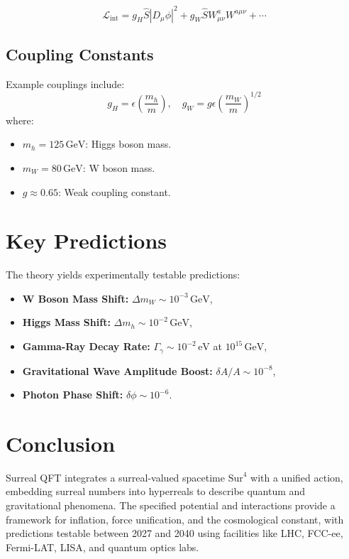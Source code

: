 \documentclass[a4paper,12pt]{article}
\begin{document}
\[
\mathcal{L}_{\text{int}} = g_H \hat{S} |D_\mu \phi|^2 + g_W \hat{S} W^a_{\mu\nu} W^{a\mu\nu} + \cdots
\]

\subsection{Coupling Constants}
Example couplings include:
\[
g_H = \epsilon \left( \frac{m_h}{m} \right), \quad g_W = g \epsilon \left( \frac{m_W}{m} \right)^{1/2}
\]
where:
\begin{itemize}
    \item \(m_h = 125 \, \text{GeV}\): Higgs boson mass.
    \item \(m_W = 80 \, \text{GeV}\): W boson mass.
    \item \(g \approx 0.65\): Weak coupling constant.
\end{itemize}

\section{Key Predictions}
The theory yields experimentally testable predictions:
\begin{itemize}
    \item \textbf{W Boson Mass Shift:} \(\Delta m_W \sim 10^{-3} \, \text{GeV}\),
    \item \textbf{Higgs Mass Shift:} \(\Delta m_h \sim 10^{-2} \, \text{GeV}\),
    \item \textbf{Gamma-Ray Decay Rate:} \(\Gamma_{\gamma} \sim 10^{-2} \, \text{eV}\) at \(10^{15} \, \text{GeV}\),
    \item \textbf{Gravitational Wave Amplitude Boost:} \(\delta A / A \sim 10^{-8}\),
    \item \textbf{Photon Phase Shift:} \(\delta \phi \sim 10^{-6}\).
\end{itemize}

\section{Conclusion}
Surreal QFT integrates a surreal-valued spacetime \(\text{Sur}^4\) with a unified action, embedding surreal numbers into hyperreals to describe quantum and gravitational phenomena. The specified potential and interactions provide a framework for inflation, force unification, and the cosmological constant, with predictions testable between 2027 and 2040 using facilities like LHC, FCC-ee, Fermi-LAT, LISA, and quantum optics labs.
\end{document}
